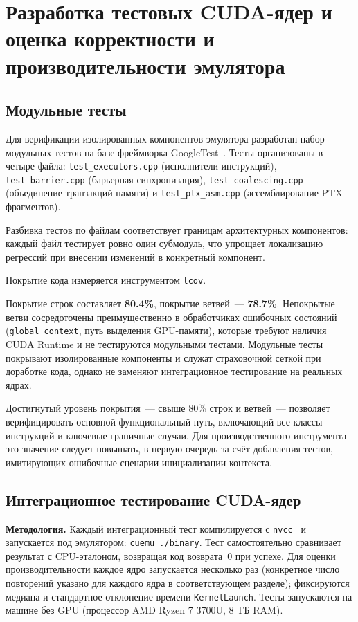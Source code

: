 \section{Разработка тестовых CUDA-ядер и оценка корректности и производительности эмулятора}

\subsection{Модульные тесты}

Для верификации изолированных компонентов эмулятора разработан
набор модульных тестов на базе фреймворка GoogleTest~\cite{GoogleTest}. Тесты
организованы в четыре файла: \texttt{test\_executors.cpp}
(исполнители инструкций), \texttt{test\_barrier.cpp} (барьерная синхронизация),
\texttt{test\_coalescing.cpp} (объединение транзакций памяти)
и \texttt{test\_ptx\_asm.cpp} (ассемблирование PTX-фрагментов).

Разбивка тестов по файлам соответствует границам архитектурных компонентов:
каждый файл тестирует ровно один субмодуль, что упрощает локализацию
регрессий при внесении изменений в конкретный компонент.

Покрытие кода измеряется инструментом \texttt{lcov}.

Покрытие строк составляет \textbf{80.4\%}, покрытие ветвей~--- \textbf{78.7\%}.
Непокрытые ветви сосредоточены преимущественно в обработчиках ошибочных
состояний (\texttt{global\_context}, путь выделения GPU-памяти),
которые требуют наличия CUDA Runtime и не тестируются модульными тестами.
Модульные тесты покрывают изолированные компоненты и служат
страховочной сеткой при доработке кода, однако не заменяют интеграционное
тестирование на реальных ядрах.

Достигнутый уровень покрытия~--- свыше 80\% строк и ветвей~--- позволяет верифицировать основной функциональный путь,
включающий все классы инструкций и ключевые граничные случаи.
Для производственного инструмента это значение
следует повышать, в первую очередь за счёт добавления тестов,
имитирующих ошибочные сценарии инициализации контекста.

\subsection{Интеграционное тестирование CUDA-ядер}

\textbf{Методология.} Каждый интеграционный тест компилируется
с \texttt{nvcc}~\cite{NVCC} и запускается под эмулятором: \texttt{cuemu ./binary}.
Тест самостоятельно сравнивает результат с CPU-эталоном, возвращая
код возврата~0 при успехе. Для оценки производительности каждое
ядро запускается несколько раз (конкретное число повторений указано для каждого ядра в соответствующем разделе); фиксируются медиана и стандартное отклонение
времени \texttt{KernelLaunch}. Тесты запускаются на машине без GPU
(процессор AMD Ryzen 7 3700U, 8~ГБ RAM).

